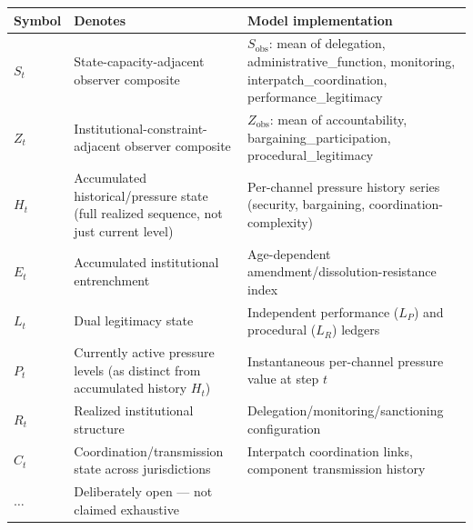 \begin{tabular}{@{}lp{6.5cm}p{5.8cm}@{}}
\toprule
\textbf{Symbol} & \textbf{Denotes} & \textbf{Model implementation} \\
\midrule
$S_t$ & State-capacity-adjacent observer composite & $S_{\text{obs}}$: mean of delegation, administrative\_function, monitoring, interpatch\_coordination, performance\_legitimacy \\
$Z_t$ & Institutional-constraint-adjacent observer composite & $Z_{\text{obs}}$: mean of accountability, bargaining\_participation, procedural\_legitimacy \\
$H_t$ & Accumulated historical/pressure state (full realized sequence, not just current level) & Per-channel pressure history series (security, bargaining, coordination-complexity) \\
$E_t$ & Accumulated institutional entrenchment & Age-dependent amendment/dissolution-resistance index \\
$L_t$ & Dual legitimacy state & Independent performance ($L_P$) and procedural ($L_R$) ledgers \\
$P_t$ & Currently active pressure levels (as distinct from accumulated history $H_t$) & Instantaneous per-channel pressure value at step $t$ \\
$R_t$ & Realized institutional structure & Delegation/monitoring/sanctioning configuration \\
$C_t$ & Coordination/transmission state across jurisdictions & Interpatch coordination links, component transmission history \\
$\ldots$ & Deliberately open --- not claimed exhaustive & \\
\bottomrule
\end{tabular}
